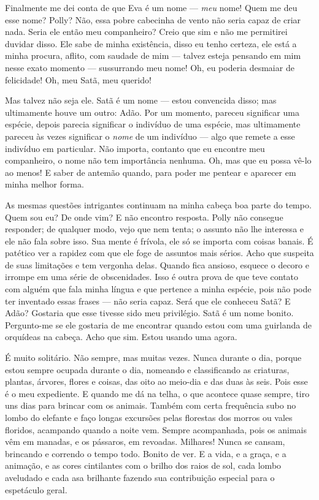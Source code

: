  Finalmente me dei conta de que Eva é um nome --- \textit{meu}
nome! Quem me deu esse nome? Polly? Não, essa pobre cabecinha de vento não seria
capaz de criar nada. Seria ele então meu companheiro? Creio que sim e não me
permitirei duvidar disso. Ele sabe de minha existência, disso eu tenho certeza,
ele está a minha procura, aflito, com saudade de mim --- talvez esteja pensando
em mim nesse exato momento --- sussurrando meu nome! Oh, eu poderia desmaiar de
felicidade! Oh, meu Satã, meu querido!

Mas talvez não seja ele. Satã é um nome --- estou convencida disso; mas
ultimamente houve um outro: Adão. Por um momento, pareceu significar uma
espécie, depois parecia significar o indivíduo de uma espécie, mas ultimamente
pareceu às vezes significar o \textit{nome} de um indivíduo --- algo que remete
a esse indivíduo em particular. Não importa, contanto que eu encontre meu
companheiro, o nome não tem importância nenhuma. Oh, mas que eu possa vê-lo ao
menos! E saber de antemão quando, para poder me pentear e aparecer em minha
melhor forma.
\sectionitem


 As mesmas questões intrigantes continuam na minha cabeça boa
parte do tempo. Quem sou eu? De onde vim? E não encontro resposta. Polly não
consegue responder; de qualquer modo, vejo que nem tenta; o assunto não
lhe interessa e ele não fala sobre isso. Sua mente é frívola, ele só se importa com
coisas banais. É patético ver a rapidez com que ele foge de assuntos mais
sérios. Acho que suspeita de suas limitações e tem vergonha delas. Quando
fica ansioso, esquece o decoro e irrompe em uma série de obscenidades. Isso é
outra prova de que teve contato com alguém que fala minha língua e que pertence a
minha espécie, pois não pode ter inventado essas frases --- não seria capaz.
Será que ele conheceu Satã? E Adão? Gostaria que esse tivesse sido
meu privilégio. Satã é um nome bonito. Pergunto-me se ele gostaria de me
encontrar quando estou com uma guirlanda de orquídeas na cabeça. Acho que sim.
Estou usando uma agora.

É muito solitário. Não sempre, mas muitas vezes. Nunca durante o dia, porque estou
sempre ocupada durante o dia, nomeando e classificando as criaturas, plantas,
árvores, flores e coisas, das oito ao meio-dia e das duas às seis. Pois esse é o
meu expediente. E quando me dá na telha, o que acontece quase sempre, tiro uns
dias para brincar com os animais. Também com certa frequência subo no lombo do
elefante e faço longas excursões pelas florestas dos morros ou vales floridos,
acampando quando a noite vem. Sempre acompanhada, pois os animais vêm em
manadas, e os pássaros, em revoadas. Milhares! Nunca se cansam, brincando e
correndo o tempo todo. Bonito de ver. E a vida, e a graça, e a animação, e as
cores cintilantes com o brilho dos raios de sol, cada lombo aveludado e cada asa
brilhante fazendo sua contribuição especial para o espetáculo geral.

